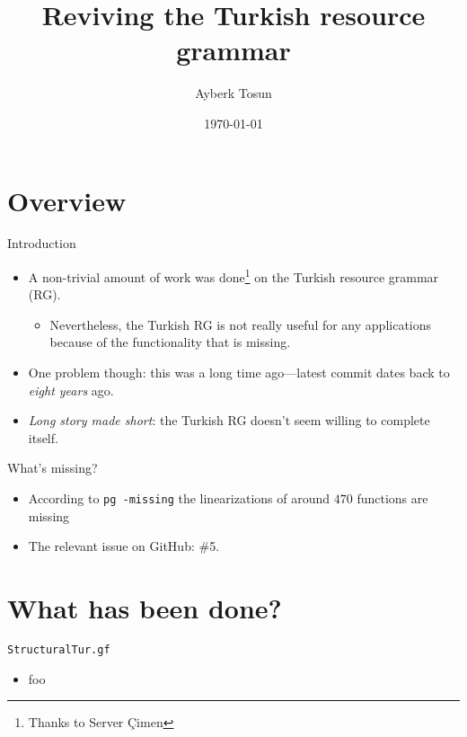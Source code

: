 \documentclass{beamer}
\title{Reviving the Turkish resource grammar}
\date{\today}
\author{Ayberk Tosun}
\institute{Fifth GF Summer School}
\begin{document}
  \maketitle

  \section{Overview}

  \begin{frame}{Introduction}
    \begin{itemize}
      \item<1-> A non-trivial amount of work was done\footnote{Thanks to Server
        \c{C}imen} on the Turkish resource grammar (RG).
        \begin{itemize}
          \item Nevertheless, the Turkish RG is not really useful for any
            applications because of the functionality that is missing.
        \end{itemize}
      \item<2-> \alert{One problem though}: this was a long time ago---latest
        commit dates back to \emph{eight years} ago.
      \item<3-> \emph{Long story made short}: the Turkish RG doesn't seem
        willing to complete itself.
    \end{itemize}
  \end{frame}

  \begin{frame}{What's missing?}
    \begin{itemize}
      \item<1-> According to \texttt{pg -missing} the linearizations of around
        $470$ functions are missing
      \item<2-> The relevant issue on GitHub: \alert{\#5}.
    \end{itemize}
  \end{frame}

  \section{What has been done?}

  \begin{frame}{\texttt{StructuralTur.gf}}
    \begin{itemize}
      \item foo
    \end{itemize}
  \end{frame}

\end{document}
